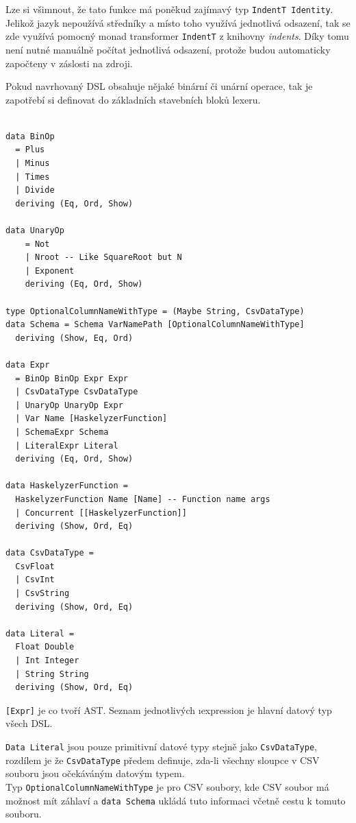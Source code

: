 \documentclass[male,czech]{kithesis}
\newcommand{\haskellInline}[1]{\colorbox{gray!10}{\texttt{#1}}}
\begin{document}
Lze si všimnout, 
že tato funkce má poněkud zajímavý typ \haskellInline{IndentT Identity}.
Jelikož jazyk nepoužívá středníky a 
místo toho využívá jednotlivá odsazení, 
tak se zde využívá pomocný monad transformer \haskellInline{IndentT} z knihovny \textit{indents}. 
Díky tomu není nutné manuálně počítat jednotlivá odsazení, 
protože budou automaticky započteny v záslosti na zdroji.

Pokud navrhovaný DSL obsahuje nějaké binární či unární operace, 
tak je zapotřebí si definovat do základních stavebních bloků lexeru.

\begin{verbatim}

data BinOp
  = Plus
  | Minus
  | Times
  | Divide
  deriving (Eq, Ord, Show)

data UnaryOp
    = Not
    | Nroot -- Like SquareRoot but N 
    | Exponent
    deriving (Eq, Ord, Show)

type OptionalColumnNameWithType = (Maybe String, CsvDataType)
data Schema = Schema VarNamePath [OptionalColumnNameWithType] 
  deriving (Show, Eq, Ord)

data Expr
  = BinOp BinOp Expr Expr
  | CsvDataType CsvDataType 
  | UnaryOp UnaryOp Expr 
  | Var Name [HaskelyzerFunction]
  | SchemaExpr Schema 
  | LiteralExpr Literal
  deriving (Eq, Ord, Show)

data HaskelyzerFunction = 
  HaskelyzerFunction Name [Name] -- Function name args
  | Concurrent [[HaskelyzerFunction]]
  deriving (Show, Ord, Eq)

data CsvDataType = 
  CsvFloat 
  | CsvInt 
  | CsvString 
  deriving (Show, Ord, Eq)

data Literal = 
  Float Double 
  | Int Integer
  | String String
  deriving (Show, Ord, Eq)

\end{verbatim}

\haskellInline{[Expr]} je co tvoří AST.
Seznam jednotlivých \i{expression} je hlavní datový typ všech DSL. 

\haskellInline{Data Literal} jsou pouze primitivní datové typy stejně jako
\haskellInline{CsvDataType}, 
rozdílem je že \haskellInline{CsvDataType} předem definuje, 
zda-li všechny sloupce v CSV souboru jsou očekáváným datovým typem. \\
Typ \haskellInline{OptionalColumnNameWithType} je pro CSV soubory, 
kde CSV soubor má možnost
mít záhlaví a \haskellInline{data Schema} ukládá tuto informaci včetně cestu k tomuto souboru. 
\end{document}
